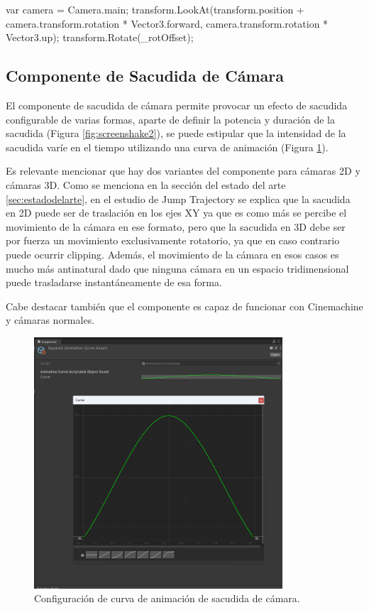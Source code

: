 \begin{mypython}[caption={Funcionamiento de LookAtCamera.},label={alg:lookAtCamera}]
    var camera = Camera.main;
    transform.LookAt(transform.position + camera.transform.rotation * Vector3.forward, camera.transform.rotation * Vector3.up);
    transform.Rotate(_rotOffset);
\end{mypython}

\subsection{Componente de Sacudida de Cámara}
El componente de sacudida de cámara permite provocar un efecto de sacudida configurable de varias formas, aparte de definir la potencia y duración de la sacudida (Figura \ref{fig:screenshake2}), se puede 
estipular que la intensidad de la sacudida varíe en el tiempo utilizando una curva de animación (Figura \ref{fig:screenshake1}). 

Es relevante mencionar que hay dos variantes del componente para cámaras 2D y cámaras 3D. Como se menciona en la sección del estado del arte \ref{sec:estadodelarte}, 
en el estudio de Jump Trajectory\cite{Screenshake} se explica que la sacudida en 2D puede ser de traslación en los ejes XY ya que es como más se percibe el movimiento de 
la cámara en ese formato, pero que la sacudida en 3D debe ser por fuerza un movimiento exclusivamente rotatorio, ya que en caso contrario puede ocurrir clipping. Además,
el movimiento de la cámara en esos casos es mucho más antinatural dado que ninguna cámara en un espacio tridimensional puede trasladarse instantáneamente de esa forma.
 
Cabe destacar también que el componente es capaz de funcionar con Cinemachine y cámaras normales. 

 
 \begin{figure}[H]
    \centering
    \includegraphics[width=350px,clip=true]{screenshakecurve.png}
    \caption{Configuración de curva de animación de sacudida de cámara.}
    \label{fig:screenshake1}
\end{figure}

